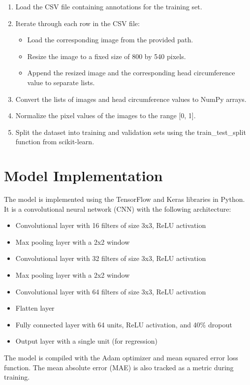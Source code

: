 \documentclass[twocolumn]{article}
\begin{document}
\begin{enumerate}
    \item Load the CSV file containing annotations for the training set.
    \item Iterate through each row in the CSV file:
    \begin{itemize}
        \item Load the corresponding image from the provided path.
        \item Resize the image to a fixed size of 800 by 540 pixels.
        \item Append the resized image and the corresponding head circumference value to separate lists.
    \end{itemize}
    \item Convert the lists of images and head circumference values to NumPy arrays.
    \item Normalize the pixel values of the images to the range [0, 1].
    \item Split the dataset into training and validation sets using the train_test_split function from scikit-learn.
\end{enumerate}

\section{Model Implementation}
The model is implemented using the TensorFlow and Keras libraries in Python. It is a convolutional neural network (CNN) with the following architecture:

\begin{itemize}
    \item Convolutional layer with 16 filters of size 3x3, ReLU activation
    \item Max pooling layer with a 2x2 window
    \item Convolutional layer with 32 filters of size 3x3, ReLU activation
    \item Max pooling layer with a 2x2 window
    \item Convolutional layer with 64 filters of size 3x3, ReLU activation
    \item Flatten layer
    \item Fully connected layer with 64 units, ReLU activation, and 40\% dropout
    \item Output layer with a single unit (for regression)
\end{itemize}

The model is compiled with the Adam optimizer and mean squared error loss function. The mean absolute error (MAE) is also tracked as a metric during training.
\end{document}
